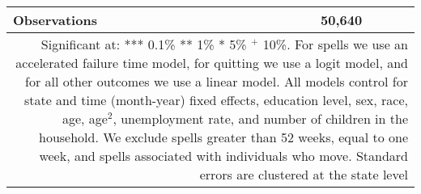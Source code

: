 \documentclass{article}
\begin{document}
\begin{table}
\begin{tabular}{rrccc}
		\multicolumn{ 2}{l}{Observations} &                                    \multicolumn{ 3}{c}{50,640} \\
		\hline
		\multicolumn{5}{p{.6\textwidth}}{{\footnotesize Significant at: *** 0.1\% ** 1\% * 5\% $^+$ 10\%. For spells we use an accelerated failure time model, for quitting we use a logit model, and for all other outcomes we use a linear model. All models control for state and time (month-year) fixed effects, education level, sex, race, age, age$^2$, unemployment rate, and number of children in the household. We exclude spells greater than 52 weeks, equal to one week, and spells associated with individuals who move. Standard errors are clustered at the state level }}\\
	\end{tabular}  
	\label{tab:robust_qt10}
\end{table}
\end{document}
